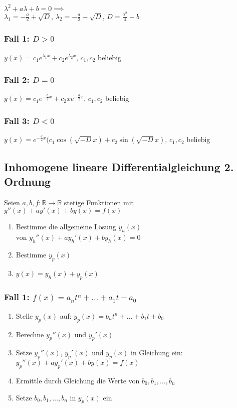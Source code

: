 \documentclass[a4paper,9pt]{extarticle}
\begin{document}
	$\lambda^2 + a \lambda + b = 0 \implies$ \\
	$\lambda_1 = - \frac a 2 + \sqrt{D}$, $\lambda_2 = - \frac a 2 - \sqrt{D}$, $D = \frac {a^2} 4 - b$
	
	\subsubsection*{Fall 1: $D > 0$}
	$y(x) = c_1e^{\lambda_1x} + c_2e^{\lambda_2x}$, $c_1,c_2$ beliebig
	
	\subsubsection*{Fall 2: $D = 0$}
	$y(x) = c_1e^{-\frac a 2 x} + c_2xe^{-\frac a 2 x}$, $c_1,c_2$ beliebig
	
	\subsubsection*{Fall 3: $D < 0$}
	$y(x) = e^{-\frac a 2 x}(c_1 \cos (\sqrt{-D} x) + c_2 \sin (\sqrt{-D} x)$, $c_1,c_2$ beliebig
	
	\pagebreak
	
	\subsection*{Inhomogene lineare Differentialgleichung 2. Ordnung}
	Seien $a,b,f : \mathbb{R} → \mathbb{R}$ stetige Funktionen mit \\
	$y''(x) + ay'(x) + by(x) = f(x)$	\\
	
	\begin{enumerate}
		\item Bestimme die allgemeine Lösung $y_h(x)$ \\
		von $y_h''(x) + ay_h'(x) + by_h(x) = 0$
		\item Bestimme $y_p(x)$
		\item $y(x) = y_h(x) + y_p(x)$
	\end{enumerate}

	\subsubsection*{Fall 1: $f(x) = a_nt^n + \dots + a_1t + a_0$}
	\begin{enumerate}
		\item Stelle $y_p(x)$ auf: $y_p(x) = b_nt^n + \dots + b_1t + b_0$
		\item Berechne $y_p''(x)$ und $y_p'(x)$
		\item Setze $y_p''(x)$, $y_p'(x)$ und $y_p(x)$ in Gleichung ein: \\
		$y_p''(x) + ay_p'(x) + by(x) = f(x)$
		\item Ermittle durch Gleichung die Werte von $b_0, b_1, \dots, b_n$
		\item Setze $b_0, b_1, \dots, b_n$ in $y_p(x)$ ein
	\end{enumerate}
\end{document}
